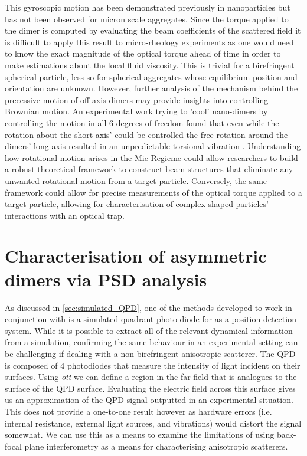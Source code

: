 This gyroscopic motion has been demonstrated previously in nanoparticles 
\cite{Zhu2021, Rashid2018, Hoang2016, Kuhn2016} but has not been observed 
for micron scale aggregates. Since the torque applied to the dimer is 
computed by evaluating the beam coefficients of the scattered field it is 
difficult to apply this result to micro-rheology experiments as one would 
need to know the exact magnitude of the optical torque ahead of time in 
order to make estimations about the local fluid viscosity. This is trivial 
for a birefringent spherical particle, less so for spherical aggregates 
whose equilibrium position and orientation are unknown. However, further 
analysis of the mechanism behind the precessive motion of off-axis dimers
may provide insights into controlling Brownian motion. An experimental work
trying to 'cool' nano-dimers by controlling the motion in all 6 degrees of 
freedom found that even while the rotation about the short axis' could be 
controlled the free rotation around the dimers' long axis resulted in an 
unpredictable torsional vibration \cite{Bang2020}. Understanding how 
rotational motion arises in the Mie-Regieme could allow researchers to 
build a robust theoretical framework to construct beam structures that 
eliminate any unwanted rotational motion from a target particle. Conversely, 
the same framework could allow for precise measurements of the optical 
torque applied to a target particle, allowing for characterisation of 
complex shaped particles' interactions with an optical trap. 

\section{Characterisation of asymmetric dimers via PSD analysis}
As discussed in \ref{sec:simulated_QPD}, one of the methods 
developed to work in conjunction with \cite{Vigilante2020} 
is a simulated quadrant photo diode for as a position 
detection system. While it is possible to extract all of 
the relevant dynamical information from a simulation, 
confirming the same behaviour in an experimental setting can 
be challenging if dealing with a non-birefringent anisotropic 
scatterer. The QPD is composed of 4 photodiodes that measure
the intensity of light incident on their surfaces. Using 
\textit{ott} we can define a region in the far-field that is 
analogues to the surface of the QPD surface. Evaluating the 
electric field across this surface gives us an approximation
of the QPD signal outputted in an experimental situation. This
does not provide a one-to-one result however as hardware errors
(i.e. internal resistance, external light sources, and vibrations)
would distort the signal somewhat. We can use this as a means 
to examine the limitations of using back-focal plane interferometry
as a means for characterising anisotropic scatterers. 

